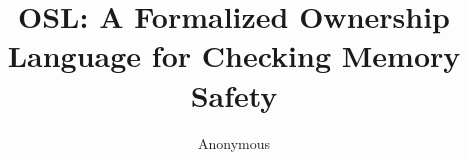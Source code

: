 \documentclass{llncs}
\begin{document}
\title{\textbf{OSL}: A Formalized Ownership Language for Checking Memory Safety}
\author{Anonymous}
%


\maketitle
















\medskip

\printbibliography


\end{document}
